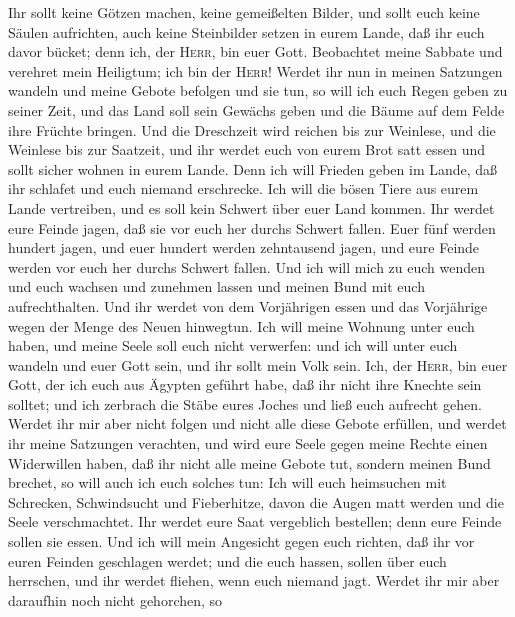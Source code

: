  Ihr sollt keine Götzen machen, keine gemeißelten Bilder,
und sollt euch keine Säulen aufrichten, auch keine Steinbilder setzen in
eurem Lande, daß ihr euch davor bücket; denn ich, der \textsc{Herr}, bin
euer Gott.  Beobachtet meine Sabbate und verehret mein
Heiligtum; ich bin der \textsc{Herr}!  Werdet ihr nun in
meinen Satzungen wandeln und meine Gebote befolgen und sie tun,
 so will ich euch Regen geben zu seiner Zeit, und das Land
soll sein Gewächs geben und die Bäume auf dem Felde ihre Früchte
bringen.  Und die Dreschzeit wird reichen bis zur
Weinlese, und die Weinlese bis zur Saatzeit, und ihr werdet euch von
eurem Brot satt essen und sollt sicher wohnen in eurem Lande.
 Denn ich will Frieden geben im Lande, daß ihr schlafet
und euch niemand erschrecke. Ich will die bösen Tiere aus eurem Lande
vertreiben, und es soll kein Schwert über euer Land kommen.
 Ihr werdet eure Feinde jagen, daß sie vor euch her durchs
Schwert fallen.  Euer fünf werden hundert jagen, und euer
hundert werden zehntausend jagen, und eure Feinde werden vor euch her
durchs Schwert fallen.  Und ich will mich zu euch wenden
und euch wachsen und zunehmen lassen und meinen Bund mit euch
aufrechthalten.  Und ihr werdet von dem Vorjährigen essen
und das Vorjährige wegen der Menge des Neuen hinwegtun. 
Ich will meine Wohnung unter euch haben, und meine Seele soll euch nicht
verwerfen:  und ich will unter euch wandeln und euer Gott
sein, und ihr sollt mein Volk sein.  Ich, der
\textsc{Herr}, bin euer Gott, der ich euch aus Ägypten geführt habe, daß
ihr nicht ihre Knechte sein solltet; und ich zerbrach die Stäbe eures
Joches und ließ euch aufrecht gehen.  Werdet ihr mir aber
nicht folgen und nicht alle diese Gebote erfüllen,  und
werdet ihr meine Satzungen verachten, und wird eure Seele gegen meine
Rechte einen Widerwillen haben, daß ihr nicht alle meine Gebote tut,
sondern meinen Bund brechet,  so will auch ich euch
solches tun: Ich will euch heimsuchen mit Schrecken, Schwindsucht und
Fieberhitze, davon die Augen matt werden und die Seele verschmachtet.
Ihr werdet eure Saat vergeblich bestellen; denn eure Feinde sollen sie
essen.  Und ich will mein Angesicht gegen euch richten,
daß ihr vor euren Feinden geschlagen werdet; und die euch hassen, sollen
über euch herrschen, und ihr werdet fliehen, wenn euch niemand jagt.
 Werdet ihr mir aber daraufhin noch nicht gehorchen, so
